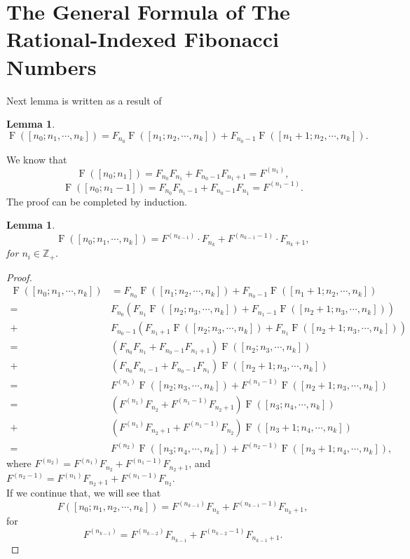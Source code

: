\documentclass[10pt,a4paper]{amsart}
\numberwithin{equation}{section}
\numberwithin{table}{section}
\numberwithin{figure}{section}
\newcommand{\Z}{\mathbb{Z}}
\DeclareMathOperator{\F}{F}
\newtheorem{lemma}[thm]{Lemma}
\begin{document}
	\section{The General Formula of The Rational-Indexed Fibonacci Numbers}Next lemma is written as a result of \cite[prop.~4]{ULUDAG2022103192}
	\begin{lemma}	\begin{equation*}		\F([n_0; n_1, \cdots, n_k]) = F_{n_0}\F([n_1; n_2,\cdots, n_k]) + F_{n_0-1}\F([n_1+1; n_2,\cdots, n_k]).	\end{equation*}\end{lemma}We know that	\begin{equation*}		\F([n_0; n_1]) = F_{n_0}F_{n_1} + F_{n_0-1}F_{n_1+1} = F^{(n_1)},	\end{equation*}	\begin{equation*}		\F([n_0; n_1-1]) = F_{n_0}F_{n_1-1} + F_{n_0-1}F_{n_1} = F^{(n_1-1)}.	\end{equation*}	The proof can be completed by induction.	\begin{lemma}		\begin{equation*}		\F([n_0; n_1,\cdots, n_k]) = F^{(n_{k-1})}\cdot F_{n_k} + F^{(n_{k-1}-1)}\cdot F_{n_k+1},		\end{equation*}		for $n_i\in\Z_+$.	\end{lemma}		\begin{proof}		\begin{align*}				\F([n_0; n_1, \cdots, n_k]) &= F_{n_0}\F([n_1; n_2,\cdots, n_k]) + F_{n_0-1}\F([n_1+1; n_2,\cdots, n_k])\\				=&F_{n_0}(F_{n_1}\F([n_2; n_3,\cdots, n_k]) + F_{n_1-1}\F([n_2+1; n_3,\cdots, n_k]))\\				+& F_{n_0-1}(F_{n_1+1}\F([n_2; n_3,\cdots, n_k]) + F_{n_1}\F([n_2+1; n_3,\cdots, n_k]))\\				=& (F_{n_0}F_{n_1} + F_{n_0-1}F_{n_1+1})\F([n_2; n_3,\cdots, n_k]) \\				+& ( F_{n_0}F_{n_1-1} + F_{n_0-1}F_{n_1} )\F([n_2+1; n_3,\cdots, n_k])\\				= & F^{(n_1)}\F([n_2; n_3,\cdots, n_k]) + F^{(n_1-1)}\F([n_2+1; n_3,\cdots, n_k])\\				= & (F^{(n_1)}F_{n_2} + F^{(n_1-1)}F_{n_2+1})\F([n_3; n_4,\cdots, n_k])\\				+& (F^{(n_1)}F_{n_2+1} + F^{(n_1-1)}F_{n_2})\F([n_3+1; n_4,\cdots, n_k])\\				=&F^{(n_2)}\F([n_3; n_4,\cdots, n_k]) + F^{(n_2-1)}\F([n_3+1; n_4,\cdots, n_k]),		\end{align*}where $F^{(n_2)} = F^{(n_1)}F_{n_2} + F^{(n_1-1)}F_{n_2+1}$, and $F^{(n_2-1)} = F^{(n_1)}F_{n_2+1} + F^{(n_1-1)}F_{n_2}$. \\If we continue that, we will see that \begin{equation}	F([n_0; n_1, n_2,\cdots, n_k]) = F^{(n_{k-1})}F_{n_k} + F^{(n_{k-1}-1)}F_{n_k+1},\end{equation}for \begin{equation*}	F^{(n_{k-1})} = F^{(n_{k-2})}F_{n_{k-1}} + F^{(n_{k-2}-1)}F_{n_{k-1}+1}.\end{equation*}\end{proof}
\end{document}
